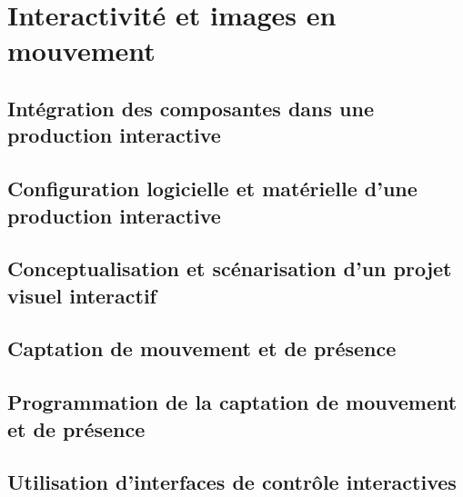 \documentclass[
]{book}
\begin{document}
\hypertarget{interagir}{%
\chapter{Interactivité et images en mouvement}\label{interagir}}

\hypertarget{intuxe9gration-des-composantes-dans-une-production-interactive}{%
\section{Intégration des composantes dans une production interactive}\label{intuxe9gration-des-composantes-dans-une-production-interactive}}

\hypertarget{configuration-logicielle-et-matuxe9rielle-dune-production-interactive}{%
\section{Configuration logicielle et matérielle d'une production interactive}\label{configuration-logicielle-et-matuxe9rielle-dune-production-interactive}}

\hypertarget{conceptualisation-et-scuxe9narisation-dun-projet-visuel-interactif}{%
\section{Conceptualisation et scénarisation d'un projet visuel interactif}\label{conceptualisation-et-scuxe9narisation-dun-projet-visuel-interactif}}

\hypertarget{captation-de-mouvement-et-de-pruxe9sence}{%
\section{Captation de mouvement et de présence}\label{captation-de-mouvement-et-de-pruxe9sence}}

\hypertarget{programmation-de-la-captation-de-mouvement-et-de-pruxe9sence}{%
\section{Programmation de la captation de mouvement et de présence}\label{programmation-de-la-captation-de-mouvement-et-de-pruxe9sence}}

\hypertarget{utilisation-dinterfaces-de-contruxf4le-interactives}{%
\section{Utilisation d'interfaces de contrôle interactives}\label{utilisation-dinterfaces-de-contruxf4le-interactives}}
\end{document}
